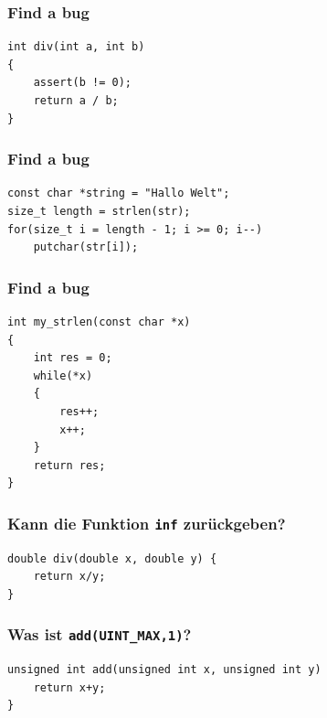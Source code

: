 \documentclass[12pt,compress]{beamer}
\begin{document}

\begin{frame}[fragile]
\frametitle{Find a bug}
\begin{lstlisting}
int div(int a, int b)
{
    assert(b != 0);
    return a / b;
}
\end{lstlisting}
\end{frame}

\begin{frame}[fragile]
\frametitle{Find a bug}
\begin{lstlisting}
const char *string = "Hallo Welt";
size_t length = strlen(str);
for(size_t i = length - 1; i >= 0; i--)
    putchar(str[i]);
\end{lstlisting}
\end{frame}

\begin{frame}[fragile]
\frametitle{Find a bug}
\begin{lstlisting}
int my_strlen(const char *x)
{
    int res = 0;
    while(*x)
    {
        res++;
        x++;
    }
    return res;
}
\end{lstlisting}
\end{frame}

\begin{frame}[fragile]
\frametitle{Kann die Funktion \texttt{inf} zurückgeben?}
\begin{lstlisting}
double div(double x, double y) {
    return x/y;
}
\end{lstlisting}
\end{frame}

\begin{frame}[fragile]
\frametitle{Was ist \texttt{add(UINT\_MAX,1)}?}
\begin{lstlisting}
unsigned int add(unsigned int x, unsigned int y)
    return x+y;
}
\end{lstlisting}
\end{frame}
\end{document}
